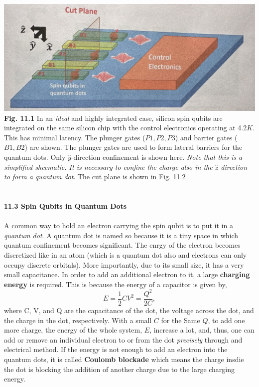 \documentclass{article}
\begin{document}
\includegraphics[scale=0.5]{Fig.11.1.jpeg}\\
\textbf{Fig. 11.1} In an \textit{ideal} and highly integrated case, silicon spin qubits are integrated on the same silicon
chip with the control electronics operating at 4.2$K$. This has minimal latency. The plunger gates
($P1, P2, P3$) and barrier gates ($B1, B2$) are shown. The plunger gates are used to form 
lateral barriers for the quantum dots. Only $\hat{y}$-direction confinement is shown here. \textit{Note that
this is a simplified shcematic. It is necessary to confine the charge also in the $\hat{z}$ direction to form
a quantum dot}. The cut plane is shown in Fig. 11.2 \\\\\\
\textbf{\large 11.3 Spin Qubits in Quantum Dots}\\\\
A common way to hold an electron carrying the spin qubit is to put it in a \textit{quantum dot}.
A quantum dot is named so because it is a tiny space in which quantum confinement becomes significant.
The enrgy of the electron becomes discretized like in an atom (which is a quantum dot also and electrons 
can only occupy discrete orbitals). More importantly, due to its small size, it has a very small capacitance. 
In order to add an additional electron to it, a large \textbf{charging energy} is required. This is because
the energy of a capacitor is given by,
\begin{equation}\label{eq 11.1}
    E=\frac{1}{2}CV^2=\frac{Q^2}{2C}, \tag{11.1}
\end{equation}
where C, V, and Q are the capacitance of the dot, the voltage across the dot,
and the charge in the dot, respectively. With a small $C$ for the Same $Q$, to add one more
charge, the energy of the whole system, $E$, increase a lot, and, thus, one can add or remove 
an individual electron to or from the dot \textit{precisely} through and electrical method.
If the energy is not enough to add an electron into the quantum dots, it is called \textbf{Coulomb blockade}
which means the charge insdie the dot is blocking the addition of another charge due to the large charging
energy.
\end{document}
